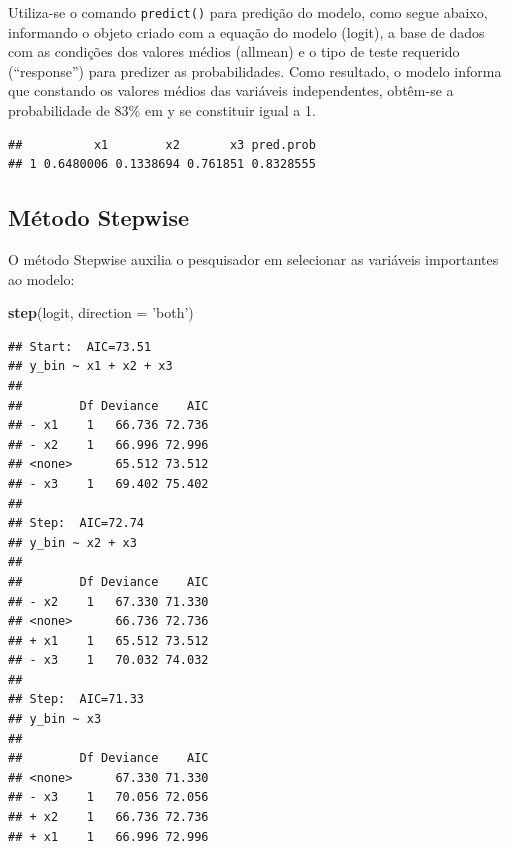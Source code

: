 \documentclass[12pt,brazil,]{book}
\newenvironment{Shaded}{\begin{snugshade}}{\end{snugshade}}
\newcommand{\DataTypeTok}[1]{\textcolor[rgb]{0.13,0.29,0.53}{#1}}
\newcommand{\KeywordTok}[1]{\textcolor[rgb]{0.13,0.29,0.53}{\textbf{#1}}}
\newcommand{\NormalTok}[1]{#1}
\newcommand{\OperatorTok}[1]{\textcolor[rgb]{0.81,0.36,0.00}{\textbf{#1}}}
\newcommand{\StringTok}[1]{\textcolor[rgb]{0.31,0.60,0.02}{#1}}
\begin{document}
Utiliza-se o comando \texttt{predict()} para predição do modelo, como
segue abaixo, informando o objeto criado com a equação do modelo
(logit), a base de dados com as condições dos valores médios (allmean) e
o tipo de teste requerido (``response'') para predizer as
probabilidades. Como resultado, o modelo informa que constando os
valores médios das variáveis independentes, obtêm-se a probabilidade de
83\% em y se constituir igual a 1.

\begin{Shaded}
\end{Shaded}

\begin{verbatim}
##          x1        x2       x3 pred.prob
## 1 0.6480006 0.1338694 0.761851 0.8328555
\end{verbatim}

\hypertarget{metodo-stepwise}{%
\subsection{Método Stepwise}\label{metodo-stepwise}}

O método Stepwise auxilia o pesquisador em selecionar as variáveis
importantes ao modelo:

\begin{Shaded}
\begin{Highlighting}[]
\KeywordTok{step}\NormalTok{(logit, }\DataTypeTok{direction =} \StringTok{'both'}\NormalTok{)}
\end{Highlighting}
\end{Shaded}

\begin{verbatim}
## Start:  AIC=73.51
## y_bin ~ x1 + x2 + x3
## 
##        Df Deviance    AIC
## - x1    1   66.736 72.736
## - x2    1   66.996 72.996
## <none>      65.512 73.512
## - x3    1   69.402 75.402
## 
## Step:  AIC=72.74
## y_bin ~ x2 + x3
## 
##        Df Deviance    AIC
## - x2    1   67.330 71.330
## <none>      66.736 72.736
## + x1    1   65.512 73.512
## - x3    1   70.032 74.032
## 
## Step:  AIC=71.33
## y_bin ~ x3
## 
##        Df Deviance    AIC
## <none>      67.330 71.330
## - x3    1   70.056 72.056
## + x2    1   66.736 72.736
## + x1    1   66.996 72.996
\end{verbatim}
\end{document}
